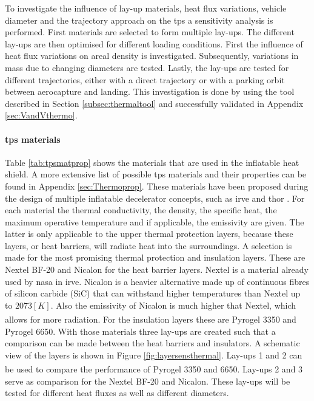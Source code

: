 To investigate the influence of lay-up materials, heat flux variations, vehicle diameter and the trajectory approach on the \gls{tps} a sensitivity analysis is performed. First materials are selected to form multiple lay-ups. The different lay-ups are then optimised for different loading conditions. First the influence of heat flux variations on areal density is investigated. Subsequently, variations in mass due to changing diameters are tested. Lastly, the lay-ups are tested for different trajectories, either with a direct trajectory or with a parking orbit between aerocapture and landing. This investigation is done by using the tool described in Section \ref{subsec:thermaltool} and successfully validated in Appendix \ref{sec:VandVthermo}.

\paragraph{\gls{tps} materials}
Table \ref{tab:tpsmatprop} shows the materials that are used in the inflatable heat shield. A more extensive list of possible \gls{tps} materials and their properties can be found in Appendix \ref{sec:Thermoprop}. These materials have been proposed during the design of multiple inflatable decelerator concepts, such as \gls{irve} and \gls{thor} \cite{Hughes2005}. For each material the thermal conductivity, the density, the specific heat, the maximum operative temperature and if applicable, the emissivity are given. The latter is only applicable to the upper thermal protection layers, because these layers, or heat barriers, will radiate heat into the surroundings.
\newline\newline
A selection is made for the most promising thermal protection and insulation layers. These are Nextel BF-20 and Nicalon for the heat barrier layers. Nextel is a material already used by \gls{nasa} in \gls{irve}. Nicalon is a heavier alternative made up of continuous fibres of silicon carbide (SiC) that can withstand higher temperatures than Nextel up to $2073 \left[K\right]$. Also the emissivity of Nicalon is much higher that Nextel, which allows for more radiation. For the insulation layers these are Pyrogel\textsuperscript{\textregistered} 3350 and Pyrogel 6650. With those materials three lay-ups are created such that a comparison can be made between the heat barriers and insulators. A schematic view of the layers is shown in Figure \ref{fig:layersensthermal}. Lay-ups 1 and 2 can be used to compare the performance of Pyrogel\textsuperscript{\textregistered} 3350 and 6650. Lay-ups 2 and 3 serve as comparison for the Nextel BF-20 and Nicalon. These lay-ups will be tested for different heat fluxes as well as different diameters.


